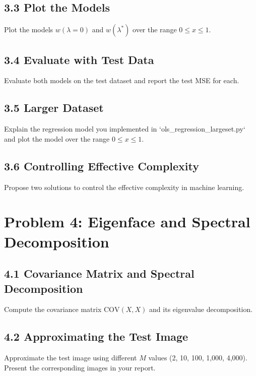 \documentclass[12pt]{article}
\begin{document}
\subsection*{3.3 Plot the Models}
Plot the models \( w(\lambda = 0) \) and \( w(\lambda^*) \) over the range \( 0 \leq x \leq 1 \).

\subsection*{3.4 Evaluate with Test Data}
Evaluate both models on the test dataset and report the test MSE for each.

\subsection*{3.5 Larger Dataset}
Explain the regression model you implemented in `ols\_regression\_largeset.py` and plot the model over the range \( 0 \leq x \leq 1 \).

\subsection*{3.6 Controlling Effective Complexity}
Propose two solutions to control the effective complexity in machine learning.

\section*{Problem 4: Eigenface and Spectral Decomposition}

\subsection*{4.1 Covariance Matrix and Spectral Decomposition}
Compute the covariance matrix \( \text{COV}(X, X) \) and its eigenvalue decomposition.

\subsection*{4.2 Approximating the Test Image}
Approximate the test image using different \( M \) values (2, 10, 100, 1,000, 4,000). Present the corresponding images in your report.
\end{document}

